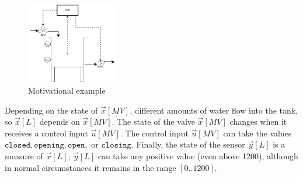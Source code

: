 \begin{figure}
  \centering
  \includegraphics[width=0.36\textwidth]{Figures/FillingTank.pdf}
  \caption{Motivational example}
  \label{fig:Motivational}
\end{figure}

Depending on the state of $\vec{x}[MV]$, different amounts of water flow into the tank, so $\vec{x}[L]$ depends on $\vec{x}[MV]$. The state of the valve $\vec{x}[MV]$ changes when it receives a control input $\vec{u}[MV]$. The control input $\vec{u}[MV]$ can take the values $\texttt{closed}, \texttt{opening},\texttt{open},$ or $\texttt{closing}$. Finally, the state of the sensor $\vec{y}[L]$ is a measure of $\vec{x}[L]$; $\vec{y}[L]$ can take any positive value (even above 1200), although in normal circumstances it remains in the range $[0..1200]$. 

